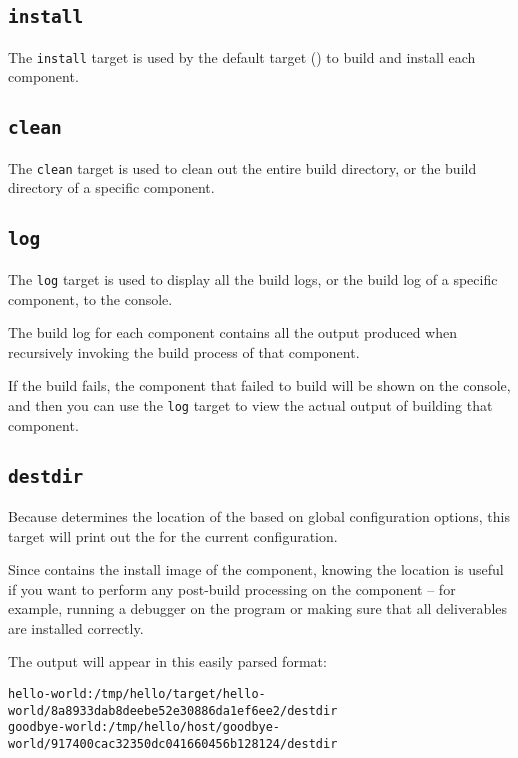 \subsection{\texttt{install}}

The \texttt{install} target is used by the default target
() to build and install each component.

\subsection{\texttt{clean}}

The \texttt{clean} target is used to clean out the entire build
directory, or the build directory of a specific component.

\subsection{\texttt{log}}

The \texttt{log} target is used to display all the build logs, or the
build log of a specific component, to the console.

The build log for each component contains all the output produced when
recursively invoking the build process of that component.

If the build fails, the component that failed to build will be shown
on the console, and then you can use the \texttt{log} target to view
the actual output of building that component.

\subsection{\texttt{destdir}}

Because \lmsbw determines the location of the \destdir based on global
configuration options, this target will print out the \destdir for the
current configuration.

Since \destdir contains the install image of the component, knowing
the \destdir location is useful if you want to perform any post-build
processing on the component -- for example, running a debugger on the
program or making sure that all deliverables are installed correctly.

The output will appear in this easily parsed format:

\begin{scriptsize}
\begin{verbatim}
hello-world:/tmp/hello/target/hello-world/8a8933dab8deebe52e30886da1ef6ee2/destdir
goodbye-world:/tmp/hello/host/goodbye-world/917400cac32350dc041660456b128124/destdir
\end{verbatim}
\end{scriptsize}


